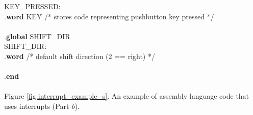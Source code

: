 \begin{center}
\begin{minipage}[t]{12.5 cm}
\begin{tabbing}
KEY\_PRESSED:\\
\>.{\bf word} \>KEY \>/* stores code representing pushbutton key pressed */\\
~\\
\>.{\bf global} \>SHIFT\_DIR\\
SHIFT\_DIR:\\
\>.{\bf word}  \>/* default shift direction (2 == right) */\\
~\\
\>.{\bf end}
~\\
~\\
Figure \ref{fig:interrupt_example_s}. An example of assembly language code that uses interrupts (Part {\it b}).
\end{tabbing}
\end{minipage}
\end{center}
